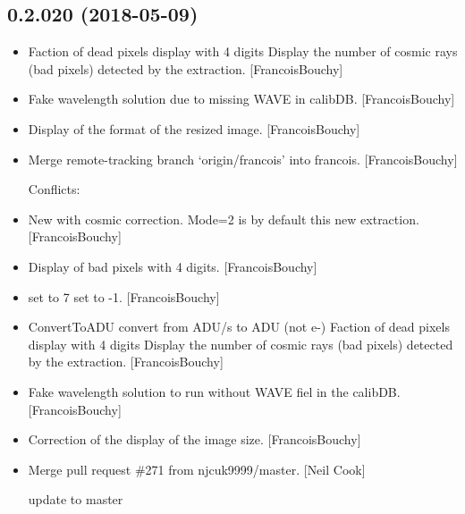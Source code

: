 \documentclass[a4paper,10pt,english]{report}
\begin{document}
\subsection{0.2.020 (2018-05-09)}
\label{\detokenize{misc/changelog:id442}}\begin{itemize}
\item {} 
Faction of dead pixels display with 4 digits Display the number of
cosmic rays (bad pixels) detected by the extraction. {[}FrancoisBouchy{]}

\item {} 
Fake wavelength solution due to missing WAVE in calibDB.
{[}FrancoisBouchy{]}

\item {} 
Display of the format of the resized image. {[}FrancoisBouchy{]}

\item {} 
Merge remote-tracking branch ‘origin/francois’ into francois.
{[}FrancoisBouchy{]}
\begin{description}
\item[{Conflicts:}] \leavevmode
{}

\end{description}

\item {} 
New  with cosmic correction. Mode=2 is by
default this new extraction. {[}FrancoisBouchy{]}

\item {} 
Display of bad pixels with 4 digits. {[}FrancoisBouchy{]}

\item {} 
 set to 7  set to -1. {[}FrancoisBouchy{]}

\item {} 
ConvertToADU convert from ADU/s to ADU (not e-) Faction of dead pixels
display with 4 digits Display the number of cosmic rays (bad pixels)
detected by the extraction. {[}FrancoisBouchy{]}

\item {} 
Fake wavelength solution to run without WAVE fiel in the calibDB.
{[}FrancoisBouchy{]}

\item {} 
Correction of the display of the image size. {[}FrancoisBouchy{]}

\item {} 
Merge pull request \#271 from njcuk9999/master. {[}Neil Cook{]}

update to master

\end{itemize}
\end{document}
